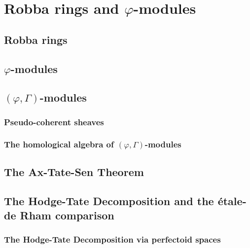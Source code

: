     \section{Robba rings and \texorpdfstring{$\varphi$}{}-modules}
        \subsection{Robba rings}
        
        \subsection{\texorpdfstring{$\varphi$}{}-modules}
    
        \subsection{\texorpdfstring{$(\varphi, \Gamma)$}{}-modules}
            \subsubsection{Pseudo-coherent sheaves}
            
            \subsubsection{The homological algebra of \texorpdfstring{$(\varphi, \Gamma)$}{}-modules}
            
    \subsection{The Ax-Tate-Sen Theorem}
    
        \subsection{The Hodge-Tate Decomposition and the \'etale-de Rham comparison}
            \subsubsection{The Hodge-Tate Decomposition via perfectoid spaces}
